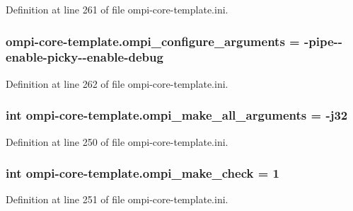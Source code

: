 Definition at line 261 of file ompi-\/core-\/template.\-ini.

\hypertarget{namespaceompi-core-template_a3617cfaebbf09bd156bb6f00d4584019}{
\subsubsection[{ompi\-\_\-configure\-\_\-arguments}]{\setlength{\rightskip}{0pt plus 5cm}ompi-\/core-\/template.\-ompi\-\_\-configure\-\_\-arguments = -\/pipe-\/-\/enable-\/picky-\/-\/enable-\/debug}}\label{namespaceompi-core-template_a3617cfaebbf09bd156bb6f00d4584019}


Definition at line 262 of file ompi-\/core-\/template.\-ini.

\hypertarget{namespaceompi-core-template_a8cfb168e266191b0299e13db0e040acf}{
\subsubsection[{ompi\-\_\-make\-\_\-all\-\_\-arguments}]{\setlength{\rightskip}{0pt plus 5cm}int ompi-\/core-\/template.\-ompi\-\_\-make\-\_\-all\-\_\-arguments = -\/j32}}\label{namespaceompi-core-template_a8cfb168e266191b0299e13db0e040acf}


Definition at line 250 of file ompi-\/core-\/template.\-ini.

\hypertarget{namespaceompi-core-template_a22a1627fa5b27a6349a7d4804e9baaca}{
\subsubsection[{ompi\-\_\-make\-\_\-check}]{\setlength{\rightskip}{0pt plus 5cm}int ompi-\/core-\/template.\-ompi\-\_\-make\-\_\-check = 1}}\label{namespaceompi-core-template_a22a1627fa5b27a6349a7d4804e9baaca}


Definition at line 251 of file ompi-\/core-\/template.\-ini.

